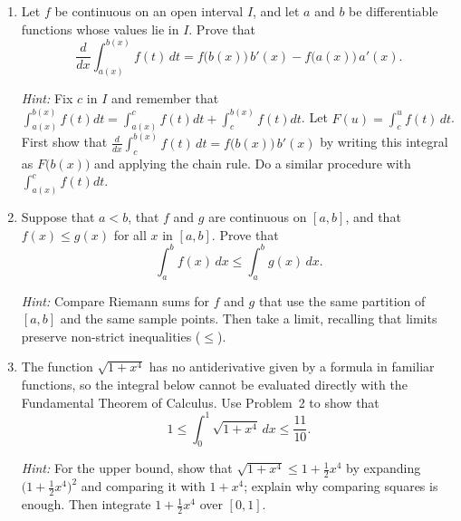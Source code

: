 \documentclass[12pt,letterpaper]{article}
\begin{document}
\begin{enumerate}[label=\textbf{\arabic*.},leftmargin=2em,itemsep=1.25em]
  \item Let $f$ be continuous on an open interval $I$, and let $a$ and $b$ be
    differentiable functions whose values lie in $I$. Prove that
    \[
      \frac{d}{dx}\int_{a(x)}^{b(x)} f(t)\,dt
      =f\bigl(b(x)\bigr)\,b'(x)-f\bigl(a(x)\bigr)\,a'(x).
    \]

    \emph{Hint:} Fix $c$ in $I$ and remember that \(\int_{a(x)}^{b(x)} f(t)dt = 
    \int_{a(x)}^{c} f(t)dt + \int_{c}^{b(x)} f(t)dt\). Let $F(u)=\int_c^u f(t)\,dt$. 
    First show that $\frac{d}{dx}\int_c^{b(x)} f(t)\,dt=f\bigl(b(x)\bigr)\,b'(x)$ by
    writing this integral as $F\bigl(b(x)\bigr)$ and applying the chain rule.
    Do a similar procedure with \(\int_{a(x)}^c f(t)dt\).

  \item Suppose that $a<b$, that $f$ and $g$ are continuous on $[a,b]$, and that
    $f(x)\le g(x)$ for all $x$ in $[a,b]$. Prove that
    \[
      \int_a^b f(x)\,dx\le\int_a^b g(x)\,dx.
    \]

    \emph{Hint:} Compare Riemann sums for $f$ and $g$ that use the same
    partition of $[a,b]$ and the same sample points. Then take a limit,
    recalling that limits preserve non-strict inequalities ($\le$).

  \item The function $\sqrt{1+x^4}$ has no antiderivative given by a formula in
    familiar functions, so the integral below cannot be evaluated directly with
    the Fundamental Theorem of Calculus. Use Problem~2 to show that
    \[
      1\le\int_0^1\sqrt{1+x^4}\,dx\le\frac{11}{10}.
    \]

    \emph{Hint:} For the upper bound, show that
    $\sqrt{1+x^4}\le 1+\tfrac{1}{2}x^4$ by expanding
    $\bigl(1+\tfrac{1}{2}x^4\bigr)^2$ and comparing it with $1+x^4$; explain
    why comparing squares is enough. Then integrate $1+\tfrac{1}{2}x^4$ over
    $[0,1]$.
\end{enumerate}
\end{document}
